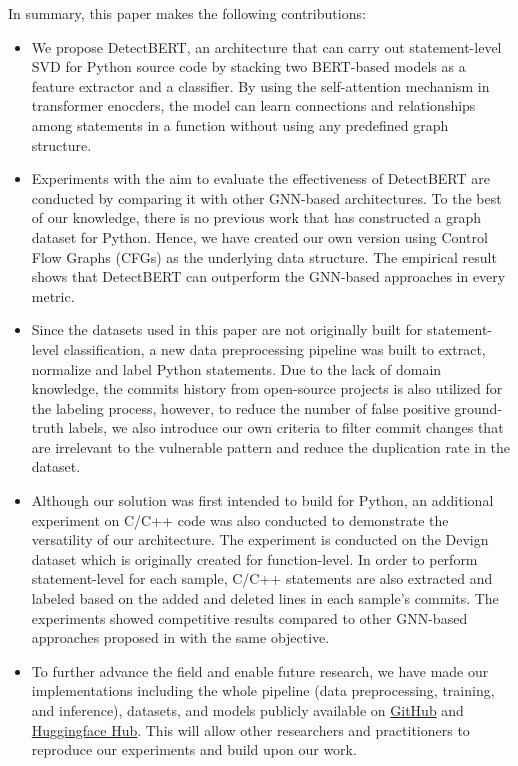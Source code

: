 \documentclass{ieeeaccess}
\begin{document}
\par In summary, this paper makes the following contributions:
\begin{itemize}
\item  We propose DetectBERT,  an architecture that can carry out statement-level SVD for Python source code  by stacking two BERT-based models as a feature extractor and a classifier. By using the self-attention mechanism  in transformer enocders\cite{attention}, the model  can learn connections and relationships among statements in a function  without using any predefined graph structure.
\item  Experiments with the aim to evaluate the effectiveness of DetectBERT are conducted by comparing it with other GNN-based architectures. To the best of our knowledge, there is no previous work that has constructed a graph dataset for Python. Hence, we have created our own version using Control Flow Graphs (CFGs) as the underlying data structure. The empirical result shows that DetectBERT can outperform the GNN-based approaches in every metric.
\item  Since the datasets \cite{VUDENC, cvefixes, devign} used  in this  paper  are not originally  built for statement-level classification,  a new data preprocessing pipeline was built  to extract, normalize and label Python statements. Due to the lack of domain knowledge,  the commits history from  open-source projects is also utilized for the labeling process, however, to reduce the number of false positive ground-truth labels,  we also introduce our own criteria to filter commit changes  that are irrelevant to the vulnerable pattern and reduce the duplication rate in the dataset. 
\item  Although our solution was first intended to build for Python, an additional experiment on C/C++ code was also conducted to demonstrate the versatility of our architecture. The experiment is conducted on the Devign dataset \cite{devign} which is originally created for function-level. In order to perform statement-level for each sample,  C/C++ statements are also extracted and labeled based on the added and deleted lines in each sample's commits. The experiments showed competitive results compared to other GNN-based approaches proposed in \cite{Linevd} with the same objective. 
\item To further advance the field and enable future research, we have made our implementations including the whole pipeline (data preprocessing, training, and inference), datasets, and models publicly available on \href{https://github.com/Edwin372/DetectBERT}{GitHub} and \href{https://huggingface.co/EddieChen372/DetectBERT}{Huggingface Hub}. This will allow other researchers and practitioners to reproduce our experiments and build upon our work. 
\end{itemize}
\end{document}
